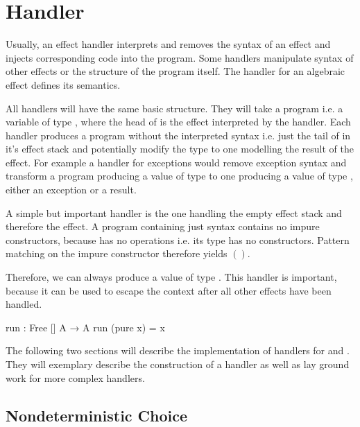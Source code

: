 \section{Handler}

Usually, an effect handler interprets and removes the syntax of an effect and
injects corresponding code into the program.
Some handlers manipulate syntax of other effects or the structure of the program
itself.
The handler for an algebraic effect defines its semantics.

All handlers will have the same basic structure.
They will take a program i.e. a variable of type
\AgdaSpace{}\AgdaSpace{}
, where the head of  is the effect interpreted by the handler.
Each handler produces a program without the interpreted syntax i.e. just the
tail of  in it's effect stack and potentially modify the type
 to one modelling the result of the effect.
For example a handler for exceptions would remove exception syntax and transform
a program producing a value of type  to one producing a value of
type \AgdaSpace{}\AgdaSpace{},
either an exception or a result.

A simple but important handler is the one handling the empty effect stack and
therefore the  effect.
A program containing just  syntax contains no impure
constructors, because  has no operations i.e. its
 type has no constructors.
Pattern matching on the impure constructor therefore yields $()$.

Therefore, we can always produce a value of type .
This handler is important, because it can be used to escape the
 context after all other effects have been handled.

\begin{code}
run : Free [] A → A
run (pure x) = x
\end{code}

The following two sections will describe the implementation of handlers for
 and .
They will exemplary describe the construction of a handler as well as lay ground
work for more complex handlers.


\subsection{Nondeterministic Choice}
\label{nondeterminism}

